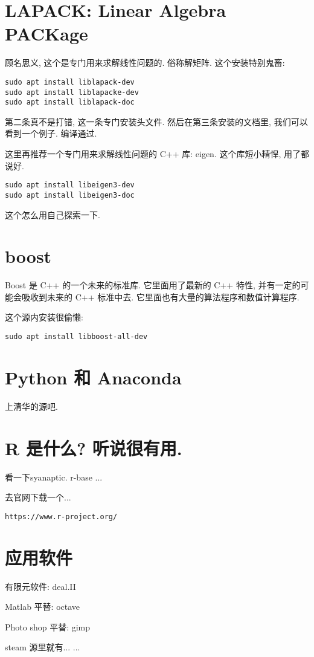 \documentclass[a4paper]{ctexart}
\begin{document}
\section{LAPACK: Linear Algebra PACKage}

顾名思义, 这个是专门用来求解线性问题的. 俗称解矩阵. 这个安装特别鬼畜:
\begin{verbatim}
sudo apt install liblapack-dev
sudo apt install liblapacke-dev
sudo apt install liblapack-doc
\end{verbatim}

第二条真不是打错, 这一条专门安装头文件. 然后在第三条安装的文档里,
我们可以看到一个例子. 编译通过.

这里再推荐一个专门用来求解线性问题的 C++ 库: eigen. 这个库短小精悍,
用了都说好.
\begin{verbatim}
sudo apt install libeigen3-dev
sudo apt install libeigen3-doc
\end{verbatim}

这个怎么用自己探索一下. 

\section{boost}

Boost 是 C++ 的一个未来的标准库. 它里面用了最新的 C++ 特性,
并有一定的可能会吸收到未来的 C++ 标准中去. 它里面也有大量的算法程序和数值计算程序.

这个源内安装很偷懒:
\begin{verbatim}
sudo apt install libboost-all-dev
\end{verbatim}

\section{Python 和 Anaconda}

上清华的源吧.

\section{R 是什么? 听说很有用.}

看一下syanaptic. r-base ...

去官网下载一个...
\begin{verbatim}
https://www.r-project.org/
\end{verbatim}

\section{应用软件}
有限元软件: deal.II

Matlab 平替: octave

Photo shop 平替: gimp

steam 源里就有...
...






\end{document}
